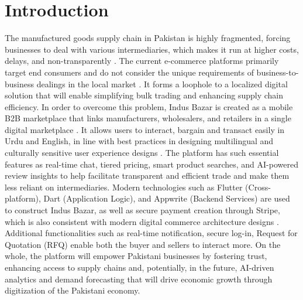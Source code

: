 \chapter{Introduction} \label{chap:intro}
The manufactured goods supply chain in Pakistan is highly fragmented, forcing businesses to deal with various intermediaries, which makes it run at higher costs, delays, and non-transparently \cite{hussain2023supply,raza2023impact}. The current e-commerce platforms primarily target end consumers and do not consider the unique requirements of business-to-business dealings in the local market \cite{ali2022ecommerce,laudon2023ecommerce}. It forms a loophole to a localized digital solution that will enable simplifying bulk trading and enhancing supply chain efficiency. In order to overcome this problem, Indus Bazar is created as a mobile B2B marketplace that links manufacturers, wholesalers, and retailers in a single digital marketplace \cite{han2023digital,farooq2024mobile}. It allows users to interact, bargain and transact easily in Urdu and English, in line with best practices in designing multilingual and culturally sensitive user experience designs \cite{akram2022user,shaikh2024design}. The platform has such essential features as real-time chat, tiered pricing, smart product searches, and AI-powered review insights to help facilitate transparent and efficient trade and make them less reliant on intermediaries. Modern technologies such as Flutter (Cross-platform), Dart (Application Logic), and Appwrite (Backend Services) are used to construct Indus Bazar, as well as secure payment creation through Stripe, which is also consistent with modern digital commerce architecture designs \cite{chaffey2022digital}. Additional functionalities such as real-time notification, secure log-in, Request for Quotation (RFQ) enable both the buyer and sellers to interact more. On the whole, the platform will empower Pakistani businesses by fostering trust, enhancing access to supply chains and, potentially, in the future, AI-driven analytics and demand forecasting that will drive economic growth through digitization of the Pakistani economy.
